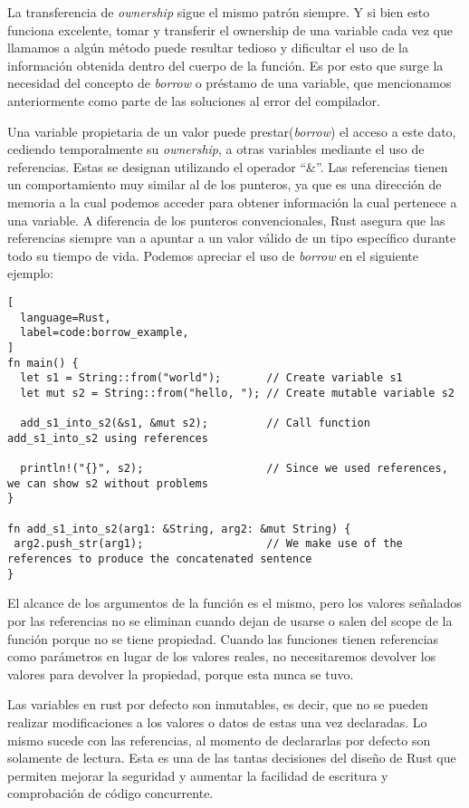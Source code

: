 La transferencia de \textit{ownership} sigue el mismo patrón siempre. Y si bien esto funciona excelente, tomar y transferir el ownership de una variable cada vez que llamamos a algún método puede resultar tedioso y dificultar el uso de la información obtenida dentro del cuerpo de la función. Es por esto que surge la necesidad del concepto de \textit{borrow} o préstamo de una variable, que mencionamos anteriormente como parte de las soluciones al error del compilador.

Una variable propietaria de un valor puede prestar(\textit{borrow}) el acceso a este dato, cediendo temporalmente su \textit{ownership}, a otras variables mediante el uso de referencias. Estas se designan utilizando el operador ``\&''. Las referencias tienen un comportamiento muy similar al de los punteros, ya que es una dirección de memoria a la cual podemos acceder para obtener información la cual pertenece a una variable. A diferencia de los punteros convencionales, Rust asegura que las referencias siempre van a apuntar a un valor válido de un tipo específico durante todo su tiempo de vida. Podemos apreciar el uso de \textit{borrow} en el siguiente ejemplo:

\begin{lstlisting}[
  language=Rust,
  label=code:borrow_example,
]
fn main() {
  let s1 = String::from("world");       // Create variable s1
  let mut s2 = String::from("hello, "); // Create mutable variable s2

  add_s1_into_s2(&s1, &mut s2);         // Call function add_s1_into_s2 using references

  println!("{}", s2);                   // Since we used references, we can show s2 without problems
}

fn add_s1_into_s2(arg1: &String, arg2: &mut String) {
 arg2.push_str(arg1);                   // We make use of the references to produce the concatenated sentence
}
\end{lstlisting}

El alcance de los argumentos de la función es el mismo, pero los valores señalados por las referencias no se eliminan cuando dejan de usarse o salen del scope de la función porque no se tiene propiedad. Cuando las funciones tienen referencias como parámetros en lugar de los valores reales, no necesitaremos devolver los valores para devolver la propiedad, porque esta nunca se tuvo.

Las variables en rust por defecto son inmutables, es decir, que no se pueden realizar modificaciones a los valores o datos de estas una vez declaradas. Lo mismo sucede con las referencias, al momento de declararlas por defecto son solamente de lectura. Esta es una de las tantas decisiones del diseño de Rust que permiten mejorar la seguridad y aumentar la facilidad de escritura y comprobación de código concurrente.

